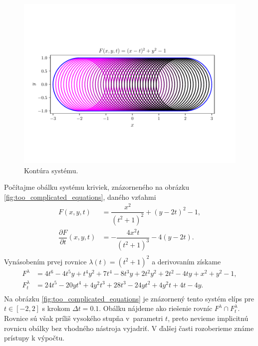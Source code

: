 \begin{figure}[h]
	\centering
	\includegraphics[trim={0.5cm 2.8cm 0.5cm 3.3cm},clip]{images/nanuk.pdf}
	\caption{Kontúra systému.}
	\label{fig:nanuk}
\end{figure}

\begin{example}
\label{example:too_complicated_equations}
Počítajme obálku systému kriviek, znázorneného na obrázku \ref{fig:too_complicated_equations}, daného vzťahmi
\begin{align*}
F(x,y, t) &= \dfrac{x^2}{(t^2 + 1)^2} + (y - 2t)^2 - 1, \\
\dfrac{\partial F}{\partial t}(x, y, t) &= -\dfrac{4x^2t}{\left(t^2+1\right)^3}-4\left(y-2t\right). \\
\end{align*}
Vynásobením prvej rovnice $ \lambda(t) = (t^2 + 1)^2$ a derivovaním získame
\begin{align*}
F^\lambda &= 4 t^6 - 4 t^5 y + t^4 y^2 + 7 t^4 - 8 t^3 y + 2 t^2 y^2 + 2 t^2 - 4 t y + x^2 + y^2 - 1, \\
F_t^\lambda &= 24t^5-20yt^4+4y^2t^3+28t^3-24yt^2+4y^2t+4t-4y. \\
\end{align*}
Na obrázku \ref{fig:too_complicated_equations} je znázornený tento systém elíps pre $t \in [-2,2]$ s krokom $\Delta t=0.1$. Obálku nájdeme ako riešenie rovníc $F^\lambda \cap F_t^\lambda. $ Rovnice sú však príliš vysokého stupňa v~parametri $t$, preto nevieme implicitnú rovnicu obálky bez vhodného nástroja vyjadriť. V ďalšej časti rozoberieme známe prístupy k výpočtu.
\end{example}

